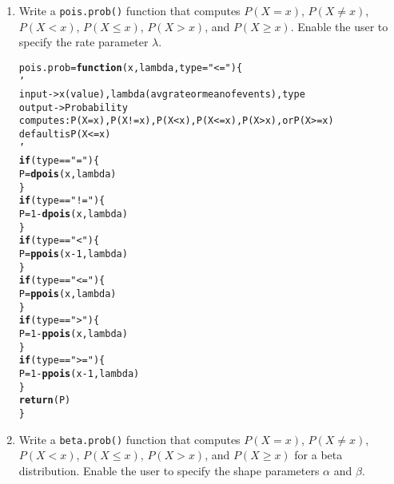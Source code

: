 \documentclass{article}\usepackage[]{graphicx}\usepackage[]{xcolor}
\makeatletter
\newcommand{\hlnum}[1]{\textcolor[rgb]{0.686,0.059,0.569}{#1}}%
\newcommand{\hlsng}[1]{\textcolor[rgb]{0.192,0.494,0.8}{#1}}%
\newcommand{\hlopt}[1]{\textcolor[rgb]{0,0,0}{#1}}%
\newcommand{\hldef}[1]{\textcolor[rgb]{0.345,0.345,0.345}{#1}}%
\newcommand{\hlkwa}[1]{\textcolor[rgb]{0.161,0.373,0.58}{\textbf{#1}}}%
\newcommand{\hlkwb}[1]{\textcolor[rgb]{0.69,0.353,0.396}{#1}}%
\newcommand{\hlkwc}[1]{\textcolor[rgb]{0.333,0.667,0.333}{#1}}%
\newcommand{\hlkwd}[1]{\textcolor[rgb]{0.737,0.353,0.396}{\textbf{#1}}}%
\newenvironment{kframe}{%
 \def\at@end@of@kframe{}%
 \ifinner\ifhmode%
  \def\at@end@of@kframe{\end{minipage}}%
  \begin{minipage}{\columnwidth}%
 \fi\fi%
 \def\FrameCommand##1{\hskip\@totalleftmargin \hskip-\fboxsep
 \colorbox{shadecolor}{##1}\hskip-\fboxsep
     \hskip-\linewidth \hskip-\@totalleftmargin \hskip\columnwidth}%
 \MakeFramed {\advance\hsize-\width
   \@totalleftmargin\z@ \linewidth\hsize
   \@setminipage}}%
 {\par\unskip\endMakeFramed%
 \at@end@of@kframe}
\newenvironment{knitrout}{}{} %
\makeatother
\begin{document}
  \begin{enumerate}
    \item Write a \texttt{pois.prob()} function that computes $P(X=x)$, 
    $P(X \neq x)$, $P(X<x)$, $P(X \leq x)$, $P(X > x)$, and $P(X \geq x).$ Enable the user to specify the rate parameter $\lambda$.
\begin{knitrout}\scriptsize
{}\color{fgcolor}\begin{kframe}
\begin{alltt}
\hldef{pois.prob} \hlkwb{=} \hlkwa{function}\hldef{(}\hlkwc{x}\hldef{,} \hlkwc{lambda}\hldef{,} \hlkwc{type} \hldef{=} \hlsng{"<="}\hldef{)\{}
  \hlsng{'
  input -> x (value), lambda (avg rate or mean of events), type
  output -> Probability
  computes: P(X=x), P(X!=x), P(X<x), P(X<=x), P(X>x), or P(X>=x)
  default is P(X<=x)
  '}
  \hlkwa{if} \hldef{(type} \hlopt{==} \hlsng{"="}\hldef{)\{}
    \hldef{P} \hlkwb{=} \hlkwd{dpois}\hldef{(x, lambda)}
  \hldef{\}}
  \hlkwa{if} \hldef{(type} \hlopt{==} \hlsng{"!="}\hldef{)\{}
    \hldef{P} \hlkwb{=} \hlnum{1} \hlopt{-} \hlkwd{dpois}\hldef{(x, lambda)}
  \hldef{\}}
  \hlkwa{if} \hldef{(type} \hlopt{==} \hlsng{"<"}\hldef{)\{}
    \hldef{P} \hlkwb{=} \hlkwd{ppois}\hldef{(x}\hlopt{-}\hlnum{1}\hldef{, lambda)}
  \hldef{\}}
  \hlkwa{if} \hldef{(type} \hlopt{==}  \hlsng{"<="}\hldef{)\{}
    \hldef{P} \hlkwb{=} \hlkwd{ppois}\hldef{(x, lambda)}
  \hldef{\}}
  \hlkwa{if} \hldef{(type} \hlopt{==} \hlsng{">"}\hldef{)\{}
    \hldef{P} \hlkwb{=} \hlnum{1} \hlopt{-} \hlkwd{ppois}\hldef{(x, lambda)}
  \hldef{\}}
  \hlkwa{if} \hldef{(type} \hlopt{==} \hlsng{">="}\hldef{)\{}
    \hldef{P} \hlkwb{=} \hlnum{1} \hlopt{-} \hlkwd{ppois}\hldef{(x}\hlopt{-}\hlnum{1}\hldef{, lambda)}
  \hldef{\}}
  \hlkwd{return}\hldef{(P)}
\hldef{\}}
\end{alltt}
\end{kframe}
\end{knitrout}
    \item Write a \texttt{beta.prob()} function that computes $P(X=x)$, 
    $P(X \neq x)$, $P(X<x)$, $P(X \leq x)$, $P(X > x)$, and $P(X \geq x)$
    for a beta distribution. Enable the user to specify the shape parameters
    $\alpha$ and $\beta$.

\end{enumerate}
\end{document}
